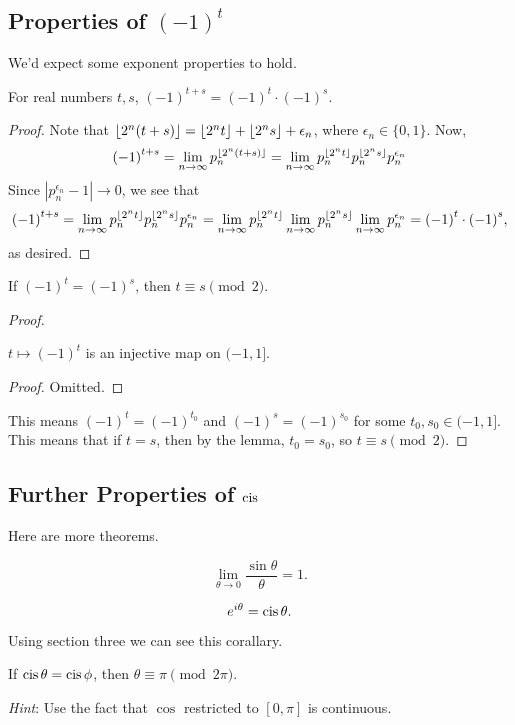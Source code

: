 \subsection{Properties of $(-1)^t$}

We'd expect some exponent properties to hold.

\begin{theorem}
    For real numbers $t,s$, ${(-1)}^{t+s} = {(-1)}^{t}\cdot {(-1)}^{s}$.
\end{theorem}

\begin{proof}
    Note that $\left \lfloor{2^n(t+s)}\right \rfloor = \left \lfloor{2^n t}\right \rfloor + \left \lfloor{2^n s}\right \rfloor + \epsilon_n$, 
    where $\epsilon_n \in \{0,1\}$.
    Now,
    \[ {(-1)}^{t+s} = \lim_{n \to \infty} p_n^{\left \lfloor{2^n(t+s)}\right \rfloor} = \lim_{n \to \infty} p_n^{\left \lfloor{2^n t}\right \rfloor} p_n^{\left \lfloor{2^n s}\right \rfloor} p_n^{\epsilon_n} \]
    Since $|p_n^{\epsilon_n} -1| \to 0$, we see that
    \[ {(-1)}^{t+s} = \lim_{n \to \infty} p_n^{\left \lfloor{2^n t}\right \rfloor} p_n^{\left \lfloor{2^n s}\right \rfloor} p_n^{\epsilon_n} = \lim_{n \to \infty} p_n^{\left \lfloor{2^n t}\right \rfloor}  \lim_{n \to \infty} p_n^{\left \lfloor{2^n s}\right \rfloor} \lim_{n \to \infty} p_n^{\epsilon_n} = {(-1)}^{t}\cdot {(-1)}^{s}, \]
    as desired.
\end{proof}

\begin{theorem}
    If $(-1)^t = (-1)^s$, then $t \equiv s \pmod{2}$.
\end{theorem}

\begin{proof}
    \begin{lemma}
        $t \mapsto (-1)^t$ is an injective map on $(-1, 1]$.
    \end{lemma}

    \begin{proof}
        Omitted.
    \end{proof}

    This means $(-1)^t = (-1)^{t_0}$ and $(-1)^s = (-1)^{s_0}$
    for some $t_0, s_0 \in (-1, 1]$.
    This means that if $t = s$, then by the lemma, $t_0 = s_0$,
    so $t \equiv s \pmod{2}$.
    
\end{proof}

\subsection{Further Properties of $\operatorname{cis}$}

Here are more theorems.

\begin{theorem}
    \[ \lim_{\theta \to 0} \frac{\sin \theta}{\theta} = 1. \]
\end{theorem}

\begin{theorem}
    \[ e^{i \theta} = \operatorname{cis} \theta. \]
\end{theorem}

Using section three we can see this corallary.
\begin{cor}
    If $\operatorname{cis}{\theta} = \operatorname{cis}{\phi}$, then $\theta \equiv \pi \pmod{2\pi}$.
\end{cor}
\emph{Hint}: Use the fact that $\cos$ restricted to $[0,\pi]$ is continuous.



